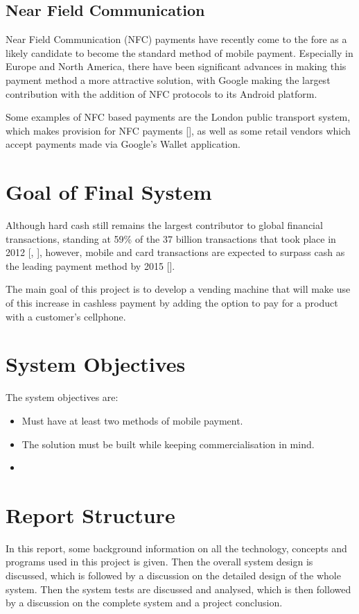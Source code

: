 \subsection{Near Field Communication}

Near Field Communication (NFC) payments have recently come to the fore as a likely candidate to
become the standard method of mobile payment. Especially in Europe and North America, there
have been significant advances in making this payment method a more attractive solution, with
Google making the largest contribution with the addition of NFC protocols to its Android
platform.

Some examples of NFC based payments are the London public transport system, which makes
provision for NFC payments [\cite{article:nfc-underground}], as well as some retail vendors
which accept payments made via Google's Wallet application.

\section{Goal of Final System}

Although hard cash still remains the largest contributor to global financial transactions,
standing at 59\% of the 37 billion transactions that took place in 2012
[\cite{article:money-transactions}, \cite{website:money-transactions}], however, mobile
and card transactions are expected to surpass cash as the leading payment method by 2015
[\cite{article:cashless-transactions}].

The main goal of this project is to develop a vending machine that will make use of this
increase in cashless payment by adding the option to pay for a product with a customer's
cellphone. 

\section{System Objectives}

The system objectives are:

\begin{itemize}
  \item Must have at least two methods of mobile payment.
  \item The solution must be built while keeping commercialisation in mind.
  \item 
\end{itemize}

\section{Report Structure}

In this report, some background information on all the technology, concepts and programs used
in this project is given. Then the overall system design is discussed, which is followed by
a discussion on the detailed design of the whole system. Then the system tests are discussed
and analysed, which is then followed by a discussion on the complete system and a
project conclusion.

